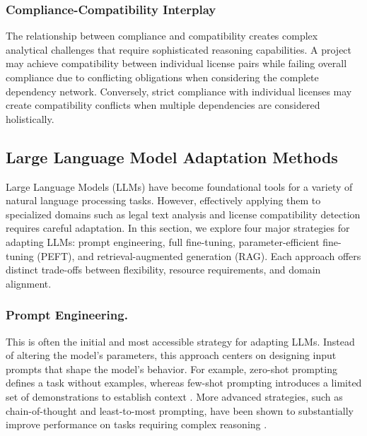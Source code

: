 \subsubsection{Compliance-Compatibility Interplay}

The relationship between compliance and compatibility creates complex analytical challenges that require sophisticated reasoning capabilities. A project may achieve compatibility between individual license pairs while failing overall compliance due to conflicting obligations when considering the complete dependency network. Conversely, strict compliance with individual licenses may create compatibility conflicts when multiple dependencies are considered holistically.


\subsection{Large Language Model Adaptation Methods}
\label{sec:llm_adaptation}

Large Language Models (LLMs) have become foundational tools for a variety of natural language processing tasks. However, effectively applying them to specialized domains such as legal text analysis and license compatibility detection requires careful adaptation. In this section, we explore four major strategies for adapting LLMs: prompt engineering, full fine-tuning, parameter-efficient fine-tuning (PEFT), and retrieval-augmented generation (RAG). Each approach offers distinct trade-offs between flexibility, resource requirements, and domain alignment.

\subsubsection{Prompt Engineering.}
This is often the initial and most accessible strategy for adapting LLMs. Instead of altering the model's parameters, this approach centers on designing input prompts that shape the model's behavior. For example, zero-shot prompting defines a task without examples, whereas few-shot prompting introduces a limited set of demonstrations to establish context \cite{brown2020language}. More advanced strategies, such as chain-of-thought and least-to-most prompting, have been shown to substantially improve performance on tasks requiring complex reasoning \cite{zhou2022least}.

